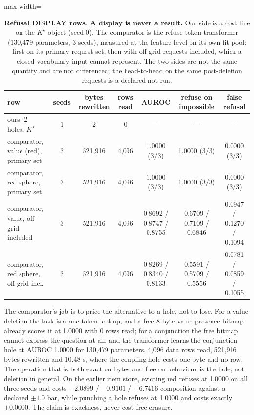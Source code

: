 \documentclass{article}
\newcommand{\Kstar}{\ensuremath{K^{\star}}}
\begin{document}
\begin{table}[t]
\centering\small
\caption{\textbf{Refusal DISPLAY rows. A display is never a result.} Our side is a cost line
on the $\Kstar$ object (seed 0). The comparator is the refuse-token transformer (130,479
parameters, 3 seeds), measured at the feature level on its own fit pool: first on its primary
request set, then with off-grid requests included, which a closed-vocabulary input cannot
represent. The two sides are not the same quantity and are not differenced; the head-to-head on
the same post-deletion requests is a declared not-run.}
\label{tab:hole}
\setlength{\tabcolsep}{3pt}
\begin{adjustbox}{max width=\linewidth}\begin{tabular}{lcccccc}
\toprule
row & seeds & bytes rewritten & rows read & AUROC & refuse on impossible & false refusal \\
\midrule
ours: 2 holes, $\Kstar$ & 1 & 2 & 0 & --- & --- & --- \\
comparator, value (red), primary set & 3 & 521,916 & 4,096 & 1.0000 (3/3) & 1.0000 (3/3) & 0.0000 (3/3) \\
comparator, red sphere, primary set & 3 & 521,916 & 4,096 & 1.0000 (3/3) & 1.0000 (3/3) & 0.0000 (3/3) \\
comparator, value, off-grid included & 3 & 521,916 & 4,096 & 0.8692 / 0.8747 / 0.8755 & 0.6709 / 0.7109 / 0.6846 & 0.0947 / 0.1270 / 0.1094 \\
comparator, red sphere, off-grid incl. & 3 & 521,916 & 4,096 & 0.8269 / 0.8340 / 0.8133 & 0.5591 / 0.5709 / 0.5556 & 0.0781 / 0.0859 / 0.1055 \\
\bottomrule
\end{tabular}\end{adjustbox}
\end{table}

\noindent The comparator's job is to price the alternative to a hole, not to lose. For a value
deletion the task is a one-token lookup, and a free 8-byte value-presence bitmap already scores
it at 1.0000 with 0 rows read; for a conjunction the free bitmap cannot express the question at
all, and the transformer learns the conjunction hole at AUROC 1.0000 for 130,479 parameters,
4,096 data rows read, 521,916 bytes rewritten and 10.48 s, where the coupling hole costs one
byte and no row.
\noindent The operation that is both exact on bytes and free on behaviour is the hole, not
deletion in general. On the earlier item store, evicting red refuses at 1.0000 on all three
seeds and costs $-2.0899$ / $-0.9101$ / $-6.7416$ composition against a declared $\pm1.0$ bar,
while punching a hole refuses at 1.0000 and costs exactly $+0.0000$.
The claim is exactness, never cost-free erasure.
\end{document}
